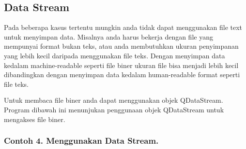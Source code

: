 \subsection{Data Stream}\label{data-stream}

Pada beberapa kasus tertentu mungkin anda tidak dapat menggunakan file
text untuk menyimpan data. Misalnya anda harus bekerja dengan file yang
mempunyai format bukan teks, atau anda membutuhkan ukuran penyimpanan
yang lebih kecil daripada menggunakan file teks. Dengan menyimpan data
kedalam machine-readable seperti file biner ukuran file bisa menjadi
lebih kecil dibandingkan dengan menyimpan data kedalam human-readable
format seperti file teks.

Untuk membaca file biner anda dapat menggunakan objek QDataStream.
Program dibawah ini menunjukan penggunaan objek QDataStream untuk
mengakses file biner.

\subsubsection*{Contoh 4. Menggunakan Data Stream.}

